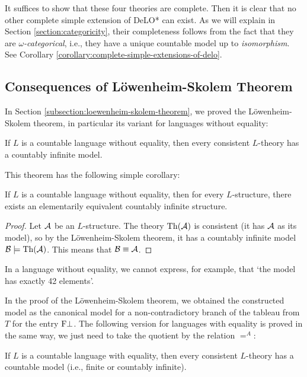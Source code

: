 It suffices to show that these four theories are complete. Then it is clear that no other complete simple extension of DeLO* can exist. As we will explain in Section \ref{section:categoricity}, their completeness follows from the fact that they are \emph{$\omega$-categorical}, i.e., they have a unique countable model up to \emph{isomorphism}. See Corollary \ref{corollary:complete-simple-extensions-of-delo}.

\subsection{Consequences of Löwenheim-Skolem Theorem}

In Section \ref{subsection:loewenheim-skolem-theorem}, we proved the Löwenheim-Skolem theorem, in particular its variant for languages without equality:

\begin{theorem-unnumbered}
    If $L$ is a countable language without equality, then every consistent $L$-theory has a countably infinite model.
\end{theorem-unnumbered}

This theorem has the following simple corollary:

\begin{corollary}\label{corollary:loewenheim-skolem-without-equality}
    If $L$ is a countable language without equality, then for every $L$-structure, there exists an elementarily equivalent countably infinite structure.
\end{corollary}
\begin{proof}
    Let $\mathcal{A}$ be an $L$-structure. The theory $\operatorname{Th}(\mathcal{A})$ is consistent (it has $\mathcal{A}$ as its model), so by the Löwenheim-Skolem theorem, it has a countably infinite model $\mathcal{B}\models\operatorname{Th}(\mathcal{A})$. This means that $\mathcal{B}\equiv\mathcal{A}$.
\end{proof}

In a language without equality, we cannot express, for example, that `the model has exactly 42 elements'.

In the proof of the Löwenheim-Skolem theorem, we obtained the constructed model as the canonical model for a non-contradictory branch of the tableau from $T$ for the entry $\mathrm{F}\bot$. The following version for languages with equality is proved in the same way, we just need to take the quotient by the relation $=^A$:

\begin{theorem-unnumbered}
    If $L$ is a countable language with equality, then every consistent $L$-theory has a countable model (i.e., finite or countably infinite).
\end{theorem-unnumbered}

